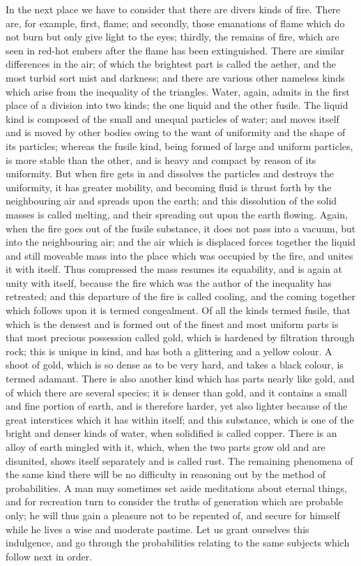 \documentclass[11pt,letter]{article}
\begin{document}
\par  In the next place we have to consider that there are divers kinds of fire. There are, for example, first, flame; and secondly, those emanations of flame which do not burn but only give light to the eyes; thirdly, the remains of fire, which are seen in red-hot embers after the flame has been extinguished. There are similar differences in the air; of which the brightest part is called the aether, and the most turbid sort mist and darkness; and there are various other nameless kinds which arise from the inequality of the triangles. Water, again, admits in the first place of a division into two kinds; the one liquid and the other fusile. The liquid kind is composed of the small and unequal particles of water; and moves itself and is moved by other bodies owing to the want of uniformity and the shape of its particles; whereas the fusile kind, being formed of large and uniform particles, is more stable than the other, and is heavy and compact by reason of its uniformity. But when fire gets in and dissolves the particles and destroys the uniformity, it has greater mobility, and becoming fluid is thrust forth by the neighbouring air and spreads upon the earth; and this dissolution of the solid masses is called melting, and their spreading out upon the earth flowing. Again, when the fire goes out of the fusile substance, it does not pass into a vacuum, but into the neighbouring air; and the air which is displaced forces together the liquid and still moveable mass into the place which was occupied by the fire, and unites it with itself. Thus compressed the mass resumes its equability, and is again at unity with itself, because the fire which was the author of the inequality has retreated; and this departure of the fire is called cooling, and the coming together which follows upon it is termed congealment. Of all the kinds termed fusile, that which is the densest and is formed out of the finest and most uniform parts is that most precious possession called gold, which is hardened by filtration through rock; this is unique in kind, and has both a glittering and a yellow colour. A shoot of gold, which is so dense as to be very hard, and takes a black colour, is termed adamant. There is also another kind which has parts nearly like gold, and of which there are several species; it is denser than gold, and it contains a small and fine portion of earth, and is therefore harder, yet also lighter because of the great interstices which it has within itself; and this substance, which is one of the bright and denser kinds of water, when solidified is called copper. There is an alloy of earth mingled with it, which, when the two parts grow old and are disunited, shows itself separately and is called rust. The remaining phenomena of the same kind there will be no difficulty in reasoning out by the method of probabilities. A man may sometimes set aside meditations about eternal things, and for recreation turn to consider the truths of generation which are probable only; he will thus gain a pleasure not to be repented of, and secure for himself while he lives a wise and moderate pastime. Let us grant ourselves this indulgence, and go through the probabilities relating to the same subjects which follow next in order.
\end{document}
